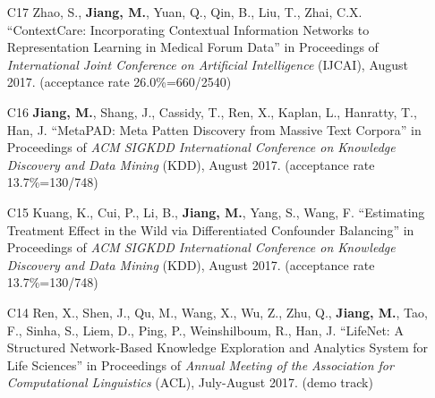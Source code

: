 \documentclass[10pt]{article}
\newenvironment{myindentpar}[1]%
{\begin{list}{}%
         {\setlength{\leftmargin}{#1}}%
         \item[]%
}
{\end{list}}
\newcounter{list}
\newcommand{\hide}[1]{}
\begin{document}
\begin{myindentpar}{0.00cm}
\begin{enumerate}[leftmargin=.5cm]
	\hide{\vspace{-0.1cm}\hspace{0.5cm}{\small \emph{I made 3\% contribution. Mr. Zhang conceived the idea in consultation with myself. Mr. Zhang did the experiments and wrote the paper.}}}

\item[C17] Zhao, S., \textbf{Jiang, M.}, Yuan, Q., Qin, B., Liu, T., Zhai, C.X. ``ContextCare: Incorporating Contextual Information Networks to Representation Learning in Medical Forum Data'' in Proceedings of \emph{International Joint Conference on Artificial Intelligence} (IJCAI), August 2017. (acceptance rate 26.0\%=660/2540)

	\hide{\vspace{-0.1cm}\hspace{0.5cm}{\small \emph{I made 30\% contribution and Mr. Zhao made 60\%. Mr. Zhao conceived the idea in consultation with myself. Mr. Zhao implemented the system and completed the experiments. I wrote the introduction section. Mr. Zhao wrote the rest of the paper.}}}

\item[C16] \textbf{Jiang, M.}, Shang, J., Cassidy, T., Ren, X., Kaplan, L., Hanratty, T., Han, J. ``MetaPAD: Meta Patten Discovery from Massive Text Corpora'' in Proceedings of \emph{ACM SIGKDD International Conference on Knowledge Discovery and Data Mining} (KDD), August 2017. (acceptance rate 13.7\%=130/748)

	\hide{\vspace{-0.1cm}\hspace{0.5cm}{\small \emph{I conceived the idea, designed the study, did the experiments, and wrote the paper. Dr. Han edited the paper.}}}

\item[C15] Kuang, K., Cui, P., Li, B., \textbf{Jiang, M.}, Yang, S., Wang, F. ``Estimating Treatment Effect in the Wild via Differentiated Confounder Balancing'' in Proceedings of \emph{ACM SIGKDD International Conference on Knowledge Discovery and Data Mining} (KDD), August 2017. (acceptance rate 13.7\%=130/748)

	\hide{\vspace{-0.1cm}\hspace{0.5cm}{\small \emph{Mr. Kuang conceived the idea in consultation with myself. Mr. Kuang implemented the system and completed the experiments. Mr. Kuang wrote the paper.}}}

\item[C14] Ren, X., Shen, J., Qu, M., Wang, X., Wu, Z., Zhu, Q., \textbf{Jiang, M.}, Tao, F., Sinha, S., Liem, D., Ping, P., Weinshilboum, R., Han, J. ``LifeNet: A Structured Network-Based Knowledge Exploration and Analytics System for Life Sciences'' in Proceedings of \emph{Annual Meeting of the Association for Computational Linguistics} (ACL), July-August 2017. (demo track)


\end{enumerate}
\end{myindentpar}
\end{document}
